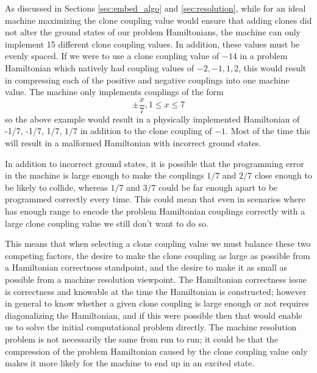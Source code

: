 As discussed in Sections \ref{sec:embed_algo} and \ref{sec:resolution}, while for an ideal machine maximizing the clone coupling value would ensure that adding clones did not alter the ground states of our problem Hamiltonians, the \machine machine can only implement 15 different clone coupling values.  In addition, these values must be evenly spaced.  If we were to use a clone coupling value of $-14$ in a problem Hamiltonian which natively had coupling values of $-2,-1,1,2$, this would result in compressing each of the positive and negative couplings into one machine value.  The machine only implements couplings of the form 
\begin{equation}
	\pm\frac{x}{7}, 1 \le x \le 7
\end{equation}
so the above example would result in a physically implemented Hamiltonian of -1/7, -1/7, 1/7, $1/7$ in addition to the clone coupling of $-1$.  Most of the time this will result in a malformed Hamiltonian with incorrect ground states.

In addition to incorrect ground states, it is possible that the programming error in the machine is large enough to make the couplings $1/7$ and $2/7$ close enough to be likely to collide, whereas $1/7$ and $3/7$ could be far enough apart to be programmed correctly every time.  This could mean that even in scenarios where \machine has enough range to encode the problem Hamiltonian couplings correctly with a large clone coupling value we still don't want to do so.

This means that when selecting a clone coupling value we must balance these two competing factors, the desire to make the clone coupling as large as possible from a Hamiltonian correctness standpoint, and the desire to make it as small as possible from a machine resolution viewpoint.  The Hamiltonian correctness issue is correctness and knowable at the time the Hamiltonian is constructed; however in general to know whether a given clone coupling is large enough or not requires diagonalizing the Hamiltonian, and if this were possible then that would enable us to solve the initial computational problem directly.
The machine resolution problem is not necessarily the same from run to run; it could be that the compression of the problem Hamiltonian caused by the clone coupling value only makes it more likely for the machine to end up in an excited state.

